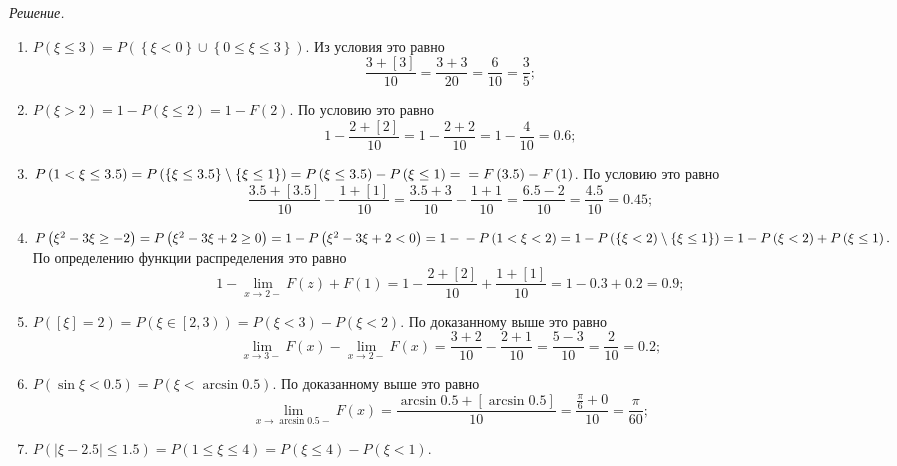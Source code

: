 \textit{Решение.}
\begin{enumerate}[label=\alph*)]
\item $P \left( \xi \leq 3 \right) = P \left( \left\{ \xi < 0 \right\} \cup \left\{ 0 \leq \xi \leq 3 \right\} \right) $.
Из условия это равно
$$ \frac{3+ \left[ 3 \right] }{10} =
\frac{3+3}{20} =
\frac{6}{10} =
\frac{3}{5};$$
\item $P \left( \xi > 2 \right) = 1 - P \left( \xi \leq 2 \right) = 1 - F \left( 2 \right) $.
По условию это равно
$$1 - \frac{2+ \left[ 2 \right] }{10} =
1 - \frac{2+2}{10} =
1 - \frac{4}{10} =
0.6;$$
\item $P \left( 1 < \xi \leq 3.5 \right) =
P \left( \left\{ \xi \leq 3.5 \right\} \setminus \left\{ \xi \leq 1 \right\} \right) =
P \left( \xi \leq 3.5 \right) - P \left( \xi \leq 1 \right) = \\
= F \left( 3.5 \right) - F \left( 1 \right) $.
По условию это равно
$$ \frac{3.5+ \left[ 3.5 \right] }{10} - \frac{1+ \left[ 1 \right] }{10} =
\frac{3.5+3}{10} - \frac{1+1}{10} =
\frac{6.5-2}{10} =
\frac{4.5}{10} =
0.45;$$
\item $P \left( \xi^2 - 3 \xi \geq -2 \right) =
P \left( \xi^2-3 \xi + 2 \geq 0 \right) =
1 - P \left( \xi^2 - 3 \xi + 2 < 0 \right) =
1 - \\
- P \left( 1 < \xi < 2 \right) =
1 - P \left( \left\{ \xi < 2 \right) \setminus \left\{ \xi \leq 1 \right\} \right) =
1 - P \left( \xi < 2 \right) + P \left( \xi \leq 1 \right).$
По определению функции распределения это равно
$$1 - \lim \limits_{x \to 2-} F \left( z \right) + F \left( 1 \right) =
1 - \frac{2+ \left[ 2 \right] }{10} + \frac{1+ \left[ 1 \right] }{10} =
1 - 0.3 + 0.2 =
0.9;$$
\item $P \left( \left[ \xi \right] = 2 \right) =
P \left( \xi \in \left[ 2, 3 \right) \right) =
P \left( \xi < 3 \right) - P \left( \xi < 2 \right) $.
По доказанному выше это равно
$$ \lim \limits_{x \to 3-} F \left( x \right) - \lim \limits_{x \to 2-} F \left( x \right) =
\frac{3+2}{10} - \frac{2+1}{10} =
\frac{5-3}{10} =
\frac{2}{10} =
0.2;$$
\item $P \left( \sin \xi < 0.5 \right) =
P \left( \xi < \arcsin 0.5 \right)$.
По доказанному выше это равно
$$ \lim \limits_{x \to \arcsin 0.5-} F \left( x \right) =
\frac{ \arcsin 0.5 + \left[ \arcsin 0.5 \right] }{10} =
\frac{ \frac{ \pi }{6} + 0}{10} =
\frac{ \pi }{60};$$
\item $P \left( \left| \xi - 2.5 \right| \leq 1.5 \right)  =
P \left( 1 \leq \xi \leq 4 \right) =
P \left( \xi \leq 4 \right) - P \left( \xi < 1 \right) $.

\end{enumerate}
